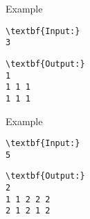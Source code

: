 Example
\begin{verbatim}
\textbf{Input:}
3
\end{verbatim}
\begin{verbatim}
\textbf{Output:}
1
1 1 1
1 1 1\end{verbatim}
Example
\begin{verbatim}
\textbf{Input:}
5
\end{verbatim}
\begin{verbatim}
\textbf{Output:}
2
1 1 2 2 2
2 1 2 1 2\end{verbatim}